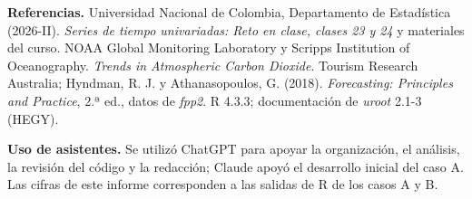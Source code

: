 \documentclass[11pt,a4paper]{article}
\begin{document}
{\small
\textbf{Referencias.} Universidad Nacional de Colombia, Departamento de Estadística (2026-II). \textit{Series de tiempo univariadas: Reto en clase, clases 23 y 24} y materiales del curso. NOAA Global Monitoring Laboratory y Scripps Institution of Oceanography. \textit{Trends in Atmospheric Carbon Dioxide}. Tourism Research Australia; Hyndman, R. J. y Athanasopoulos, G. (2018). \textit{Forecasting: Principles and Practice}, 2.ª ed., datos de \textit{fpp2}. R 4.3.3; documentación de \textit{uroot} 2.1-3 (HEGY).

\textbf{Uso de asistentes.} Se utilizó ChatGPT para apoyar la organización, el análisis, la revisión del código y la redacción; Claude apoyó el desarrollo inicial del caso A. Las cifras de este informe corresponden a las salidas de R de los casos A y B.}
\end{document}
